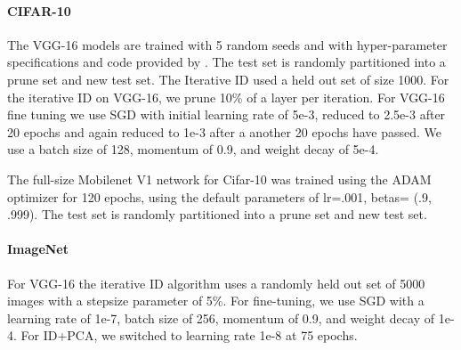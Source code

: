\paragraph{CIFAR-10}
The VGG-16 models are trained with 5 random seeds and with hyper-parameter specifications and code provided by \citet{liu2019rethink}.
The test set is randomly partitioned into a prune set and new test set.
The Iterative ID used a held out set of size 1000.
For the iterative ID on VGG-16, we prune 10\% of a layer per iteration.  %
For VGG-16 fine tuning we use SGD with initial learning rate of 5e-3, reduced to 2.5e-3 after 20 epochs and again reduced to 1e-3 after a another 20 epochs have passed.
We use a batch size of 128, momentum of 0.9, and weight decay of 5e-4.

The full-size Mobilenet V1 network for Cifar-10 was trained using the ADAM optimizer for 120 epochs, using the default parameters of lr=.001, betas= (.9, .999).  The test set is randomly partitioned into a prune set and new test set.  

\paragraph{ImageNet}
For VGG-16 the iterative ID algorithm uses a randomly held out set of 5000 images with a stepsize parameter of 5\%.
For fine-tuning, we use SGD with a learning rate of 1e-7, batch size of 256, momentum of 0.9, and weight decay of 1e-4.
For ID+PCA, we switched to learning rate 1e-8 at 75 epochs.


